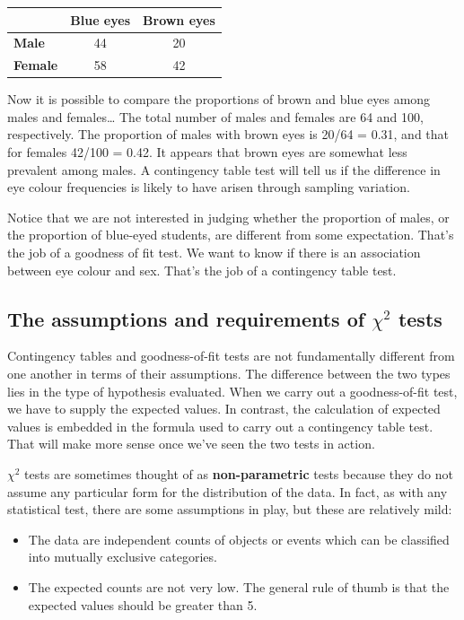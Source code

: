 \documentclass[
]{book}
\providecommand{\tightlist}{%
  \setlength{\itemsep}{0pt}\setlength{\parskip}{0pt}}
\begin{document}
\begin{longtable}[]{@{}lcc@{}}
\toprule
& Blue eyes & Brown eyes \\
\midrule
\endhead
\textbf{Male} & 44 & 20 \\
\textbf{Female} & 58 & 42 \\
\bottomrule
\end{longtable}

Now it is possible to compare the proportions of brown and blue eyes among males and females\ldots{} The total number of males and females are 64 and 100, respectively. The proportion of males with brown eyes is 20/64 = 0.31, and that for females 42/100 = 0.42. It appears that brown eyes are somewhat less prevalent among males. A contingency table test will tell us if the difference in eye colour frequencies is likely to have arisen through sampling variation.

Notice that we are not interested in judging whether the proportion of males, or the proportion of blue-eyed students, are different from some expectation. That's the job of a goodness of fit test. We want to know if there is an association between eye colour and sex. That's the job of a contingency table test.

\hypertarget{the-assumptions-and-requirements-of-chi2-tests}{%
\subsection{\texorpdfstring{The assumptions and requirements of \(\chi^{2}\) tests}{The assumptions and requirements of \textbackslash chi\^{}\{2\} tests}}\label{the-assumptions-and-requirements-of-chi2-tests}}

Contingency tables and goodness-of-fit tests are not fundamentally different from one another in terms of their assumptions. The difference between the two types lies in the type of hypothesis evaluated. When we carry out a goodness-of-fit test, we have to supply the expected values. In contrast, the calculation of expected values is embedded in the formula used to carry out a contingency table test. That will make more sense once we've seen the two tests in action.

\(\chi^{2}\) tests are sometimes thought of as \textbf{non-parametric} tests because they do not assume any particular form for the distribution of the data. In fact, as with any statistical test, there are some assumptions in play, but these are relatively mild:

\begin{itemize}
\tightlist
\item
  The data are independent counts of objects or events which can be classified into mutually exclusive categories.
\item
  The expected counts are not very low. The general rule of thumb is that the expected values should be greater than 5.
\end{itemize}
\end{document}
